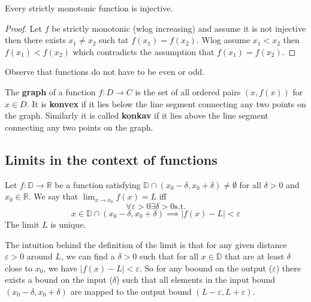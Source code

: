 \begin{theorem}
    Every strictly monotonic function is injective.
\end{theorem}

\begin{proof}
    Let $f$ be strictly monotonic (wlog increasing) and assume it is not injective then there exists $x_1 \neq x_2$ such tat $f(x_1) = f(x_2)$. Wlog assume $x_1 < x_2$ then $f(x_1) < f(x_2)$ which contradicts the assumption that $f(x_1) = f(x_2)$.
\end{proof}

\begin{remark}
    Observe that functions do not have to be even or odd.
\end{remark}

\begin{definition}
    The \textbf{graph} of a function $f: D \to C$ is the set of all ordered pairs $(x, f(x))$ for $x \in D$. It is \textbf{konvex} if it lies below the line segment connecting any two points on the graph. Similarly it is called \textbf{konkav} if it lies above the line segment connecting any two points on the graph.
\end{definition}

\subsection{Limits in the context of functions}

\begin{definition}
    Let $f: \mathbb{D} \to \mathbb{R}$ be a function satisfying $\mathbb{D} \cap (x_0 - \delta, x_0 + \delta) \neq \emptyset$ for all $\delta > 0$ and $x_0 \in \mathbb{R}$. We say that $\lim_{x \to x_0} f(x) = L$ iff 
    $$\forall \varepsilon > 0 \exists \delta > 0  \text{s.t.}$$
    $$x \in \mathbb{D} \cap (x_0 - \delta, x_0 + \delta) \implies |f(x) - L| < \varepsilon$$
    The limit $L$ is unique.
\end{definition}

\begin{remark}
    The intuition behind the definition of the limit is that for any given distance $\varepsilon > 0$ around $L$, 
    we can find a $\delta > 0$ such that for all $x \in \mathbb{D}$ that are at least $\delta$ close to $x_0$, we have $|f(x) - L| < \varepsilon$. 
    So for any boound on the output ($\varepsilon$) there exists a bound on the input ($\delta$) such that all elements in the input bound $(x_0 - \delta, x_0 + \delta)$ are mapped to the output bound $(L - \varepsilon, L + \varepsilon)$.
\end{remark}

